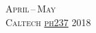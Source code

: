 \documentclass[landscape,a4paper]{article}
\begin{document}
\pagestyle{empty} %

\noindent



\begin{center}
\textsc{\LARGE April\,--\,May}\\ %
\textsc{\large Caltech \href{https://piazza.com/caltech/spring2018/ph237}{ph237} 2018} %
\end{center}

\end{document}
